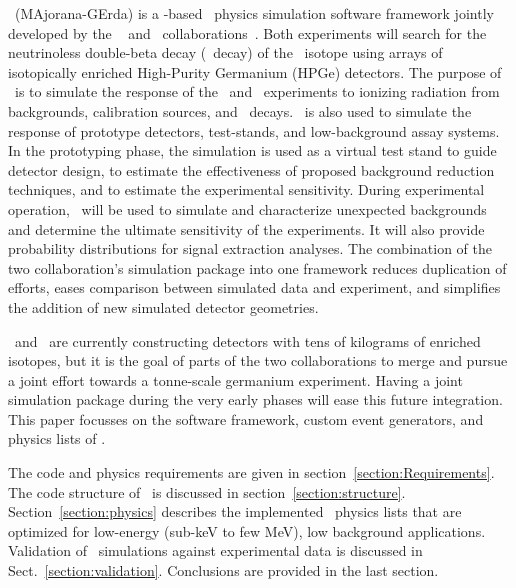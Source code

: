 \documentclass[article]{IEEEtran}
\begin{document}
\MaGe\ (MAjorana-GErda) is a \GF-based~\cite{Agostinelli:2002hh,Allison:2006} physics simulation 
software 
framework jointly developed by the \MJ ~\cite{Aalseth:2004yt} and
\Gerda\ collaborations~\cite{Schoenert:2005}. Both experiments will
search for the neutrinoless double-beta decay (\nubb\ decay)
of the \GeSS\ isotope using arrays of isotopically enriched High-Purity Germanium (HPGe) detectors.  
The purpose of \MaGe\ is to simulate the response of the \MJ\ and \Gerda\ 
experiments to ionizing radiation from backgrounds, calibration sources, and \nubb\ decays. 
\MaGe\ is also used to simulate the response of prototype detectors, test-stands, and low-background 
assay systems.  
In the prototyping phase, the simulation
is used as a virtual test stand to guide detector design, to estimate the
effectiveness of proposed background reduction techniques, and to estimate
the experimental sensitivity. During experimental operation, \MaGe\ will be used to simulate and characterize unexpected
backgrounds and determine the ultimate sensitivity of the experiments. It will also provide 
probability distributions for signal extraction analyses.
The combination of the two collaboration's simulation package into one framework 
reduces duplication of efforts, eases comparison between simulated data and experiment, and simplifies the addition of new simulated detector geometries. 

\MJ\ and \Gerda\ are currently constructing detectors with tens of kilograms of enriched isotopes, but it is the goal of parts of the two collaborations to merge and pursue a joint effort towards a tonne-scale germanium experiment. Having a joint simulation package during the very early phases will ease this future integration. This paper focusses on the software framework, custom event generators, and physics lists of \MaGe .

The code and physics requirements are given in section~\ref{section:Requirements}. The code structure of \MaGe\ is discussed in section~\ref{section:structure}. 
Section~\ref{section:physics} describes the implemented \GF\ physics lists that are optimized for low-energy (sub-keV to few MeV), low background applications. Validation of \MaGe\ 
simulations against experimental data is discussed in Sect.~\ref{section:validation}.
Conclusions are provided in the last section.

\end{document}
